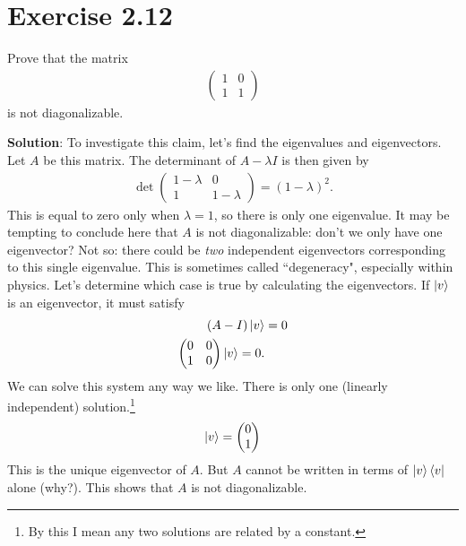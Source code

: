 \documentclass{book}
\begin{document}
\section*{Exercise 2.12}
    Prove that the matrix
    \begin{align}
        \begin{pmatrix}
            1 & 0 \\
            1 & 1
        \end{pmatrix}
    \end{align}
    is not diagonalizable.
    
    \textbf{Solution}: To investigate this claim, let's find the eigenvalues and eigenvectors. Let $A$ be this matrix. The determinant of $A - \lambda I$ is then given by
    \begin{align}
        \det \begin{pmatrix}
            1-\lambda & 0 \\
            1 & 1-\lambda 
        \end{pmatrix} = (1-\lambda)^2.
    \end{align}
    This is equal to zero only when $\lambda = 1$, so there is only one eigenvalue. It may be tempting to conclude here that $A$ is not diagonalizable: don't we only have one eigenvector? Not so: there could be \emph{two} independent eigenvectors corresponding to this single eigenvalue. This is sometimes called ``degeneracy", especially within physics. Let's determine which case is true by calculating the eigenvectors. If $\ket{v}$ is an eigenvector, it must satisfy
    \begin{align}
    \begin{aligned}
        (A-I)\ket{v} &= 0 \\
        \begin{pmatrix}
            0 & 0 \\
            1 & 0
        \end{pmatrix} \ket{v} = 0.
    \end{aligned}
    \end{align}
    We can solve this system any way we like. There is only one (linearly independent) solution.\footnote{By this I mean any two solutions are related by a constant.}
    \begin{align}
        \ket{v} = \begin{pmatrix}
            0 \\
            1
        \end{pmatrix}
    \end{align}
    This is the unique eigenvector of $A$. But $A$ cannot be written in terms of $\ket{v}\bra{v}$ alone (why?). This shows that $A$ is not diagonalizable. 
    
\end{document}
